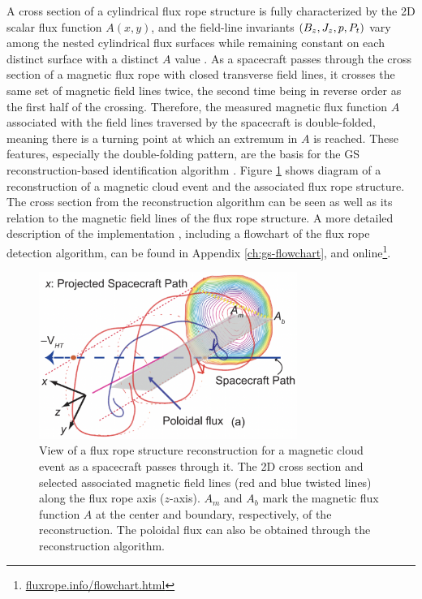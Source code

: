 A cross section of a cylindrical flux rope structure is fully characterized by the 2D scalar flux function $A(x, y)$, and the field-line invariants $\left( B_z,J_z,p, P_t \right)$ vary among the nested cylindrical flux surfaces while remaining constant on each distinct surface with a distinct $A$ value \citep{Hu:2018}. As a spacecraft passes through the cross section of a magnetic flux rope with closed transverse field lines, it crosses the same set of magnetic field lines twice, the second time being in reverse order as the first half of the crossing. Therefore, the measured magnetic flux function $A$ associated with the field lines traversed by the spacecraft is double-folded, meaning there is a turning point at which an extremum in $A$ is reached. These features, especially the double-folding pattern, are the basis for the GS reconstruction-based identification algorithm \citep{Hu:2018}. Figure \ref{fig:GSreconstruction_Hu2017} shows diagram of a reconstruction of a magnetic cloud event and the associated flux rope structure. The cross section from the reconstruction algorithm can be seen as well as its relation to the magnetic field lines of the flux rope structure.
A more detailed description of the implementation \citep{Hu:2018}, including a flowchart of the flux rope detection algorithm, can be found in Appendix \ref{ch:gs-flowchart}, and online\footnote{\url{fluxrope.info/flowchart.html}}.

\begin{figure}
    \centering
    \includegraphics[width=0.75\textwidth]{Figures/Hu2017_5a.png}
    \caption[2D cross section view of a flux rope structure reconstruction] {View of a flux rope structure reconstruction for a magnetic cloud event \citep{Hu:2015} as a spacecraft passes through it. The 2D cross section and selected associated magnetic field lines (red and blue twisted lines) along the flux rope axis ($z$-axis). $A_m$ and $A_b$ mark the magnetic flux function $A$ at the center and boundary, respectively, of the reconstruction. The poloidal flux can also be obtained through the reconstruction algorithm.} %
    \label{fig:GSreconstruction_Hu2017}
\end{figure}


